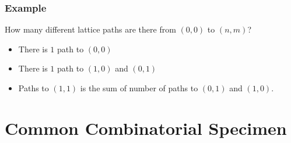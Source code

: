 \documentclass{beamer}
\begin{document}
\begin{frame}
  \frametitle{Example}
  \vspace{10pt}
  How many different lattice paths are there from $(0,0)$ to $(n,m)$?
  \vspace{-10pt}
      \vspace{10pt}
      \footnotesize
      \begin{itemize}
        \item There is $1$ path to $(0,0)$
        \item There is $1$ path to $(1,0)$ and $(0,1)$
        \item Paths to $(1,1)$ is the sum of number of paths to $(0,1)$ and $(1,0)$.
      \end{itemize}
\end{frame}

\section*{Common Combinatorial Specimen}
\end{document}
